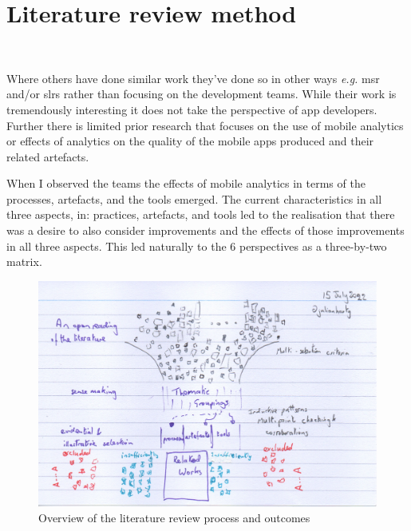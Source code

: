 \section{Literature review method}~\label{rw-tactics-and-topics-for-this-chapter}

Where others have done similar work they've done so in other ways \emph{e.g.} \Gls{msr} and/or \Glspl{slr} rather than focusing on the development teams. While their work is tremendously interesting it does not take the perspective of app developers. Further there is limited prior research that focuses on the use of mobile analytics or effects of analytics on the quality of the mobile apps produced and their related artefacts. 

When I observed the teams the effects of mobile analytics in terms of the processes, artefacts, and the tools emerged. The current characteristics in all three aspects, in: practices, artefacts, and tools led to the realisation that there was a desire to also consider improvements and the effects of those improvements in all three aspects. This led naturally to the 6 perspectives as a three-by-two matrix. 


\begin{figure}
    \centering
    \includegraphics[width=\textwidth]{images/rough-sketches/literature-review-overview.jpeg}
    \caption{Overview of the literature review process and outcomes}
    \label{fig:literature-review-overview}
\end{figure}

